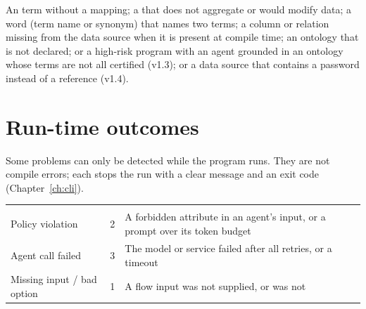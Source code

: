 An  term without a  mapping; a  that does not aggregate or would modify data; a word (term name or synonym) that names two terms; a column or relation missing from the data source when it is present at compile time;  an ontology that is not declared; or a high-risk program with an agent grounded in an ontology whose terms are not all certified (v1.3); or a data source that contains a password instead of a  reference (v1.4).

\section{Run-time outcomes}

Some problems can only be detected while the program runs. They are not compile errors; each stops the run with a clear message and an exit code (Chapter~\ref{ch:cli}).

\begin{center}
\small
\begin{tabularx}{\linewidth}{@{}L{4.3cm}L{1.3cm}Y@{}}
\toprule
{} &  & \\
\goldrule
Policy violation & 2 & A forbidden attribute in an agent's input, or a prompt over its token budget\\
Agent call failed & 3 & The model or service failed after all retries, or a timeout\\
Missing input / bad option & 1 & A flow input was not supplied, or  was not \\
\bottomrule
\end{tabularx}
\end{center}

